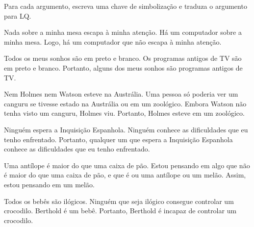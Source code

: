 \problempart
\label{pr.QLarguments}
Para cada argumento, escreva uma chave de simbolização e traduza o argumento para LQ.
\begin{earg}
\item Nada sobre a minha mesa escapa à minha atenção. Há um computador sobre a minha mesa. Logo, há um computador que não escapa à minha atenção.
\item Todos os meus sonhos são em preto e branco. Os programas antigos de TV são em preto e branco. Portanto, alguns dos meus sonhos são programas antigos de TV.
\item Nem Holmes nem Watson esteve na Austrália. Uma pessoa só poderia ver um canguru se tivesse estado na Austrália ou em um zoológico. Embora Watson não tenha visto um canguru, Holmes viu. Portanto, Holmes esteve em um zoológico.
\item Ninguém espera a Inquisição Espanhola. Ninguém conhece as dificuldades que eu tenho enfrentado. Portanto, qualquer um que espera a Inquisição Espanhola conhece as dificuldades que eu tenho enfrentado.
\item Uma antílope é maior do que uma caixa de pão. Estou pensando em algo que não é maior do que uma caixa de pão, e que é ou uma antílope ou um melão. Assim, estou pensando em um melão.
\item Todos os bebês são ilógicos. Ninguém que seja ilógico consegue controlar um crocodilo. Berthold é um bebê. Portanto, Berthold é incapaz de controlar um crocodilo.
\end{earg}

